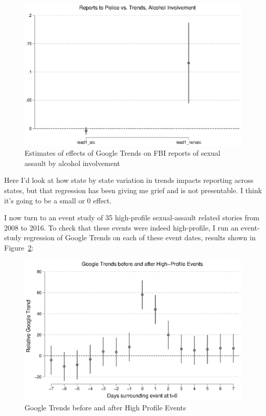 \documentclass[AER,draftmode]{AEA}
\begin{document}
\begin{figure}
\includegraphics[width=\linewidth]{figures/police_trend_daily_alc.eps}
\caption{Estimates of effects of Google Trends on FBI reports of sexual assault by alcohol involvement} \label{figure:police_trends_daily_by_alc}
\end{figure}

Here I'd look at how state by state variation in trends impacts reporting across states, but that regression has been giving me grief and is not presentable. I think it's going to be a small or 0 effect.

I now turn to an event study of 35 high-profile sexual-assault related stories from 2008 to 2016. To check that these events were indeed high-profile, I run an event-study regression of Google Trends on each of these event dates, results shown in Figure~\ref{figure:events_trend}:

\begin{figure}
\includegraphics[width=\linewidth]{figures/events_trend.eps}
\caption{Google Trends before and after High Profile Events} \label{figure:events_trend}
\end{figure}
\end{document}
